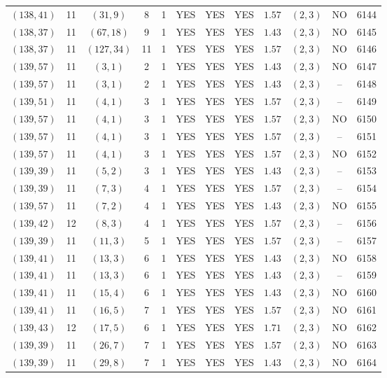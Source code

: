 \begin{longtable}{|c|c|c|c|c|c|c|c|c|c|c|c|}
$(138,41)$ & 11 & $(31,9)$ & 8 & 1 & YES & YES & YES & $1.57$ & $(2,3)$ & NO & 6144\\
$(138,37)$ & 11 & $(67,18)$ & 9 & 1 & YES & YES & YES & $1.43$ & $(2,3)$ & NO & 6145\\
$(138,37)$ & 11 & $(127,34)$ & 11 & 1 & YES & YES & YES & $1.57$ & $(2,3)$ & NO & 6146\\
$(139,57)$ & 11 & $(3,1)$ & 2 & 1 & YES & YES & YES & $1.43$ & $(2,3)$ & NO & 6147\\
$(139,57)$ & 11 & $(3,1)$ & 2 & 1 & YES & YES & YES & $1.43$ & $(2,3)$ & -- & 6148\\
$(139,51)$ & 11 & $(4,1)$ & 3 & 1 & YES & YES & YES & $1.57$ & $(2,3)$ & -- & 6149\\
$(139,57)$ & 11 & $(4,1)$ & 3 & 1 & YES & YES & YES & $1.57$ & $(2,3)$ & NO & 6150\\
$(139,57)$ & 11 & $(4,1)$ & 3 & 1 & YES & YES & YES & $1.57$ & $(2,3)$ & -- & 6151\\
$(139,57)$ & 11 & $(4,1)$ & 3 & 1 & YES & YES & YES & $1.57$ & $(2,3)$ & NO & 6152\\
$(139,39)$ & 11 & $(5,2)$ & 3 & 1 & YES & YES & YES & $1.43$ & $(2,3)$ & -- & 6153\\
$(139,39)$ & 11 & $(7,3)$ & 4 & 1 & YES & YES & YES & $1.57$ & $(2,3)$ & -- & 6154\\
$(139,57)$ & 11 & $(7,2)$ & 4 & 1 & YES & YES & YES & $1.43$ & $(2,3)$ & NO & 6155\\
$(139,42)$ & 12 & $(8,3)$ & 4 & 1 & YES & YES & YES & $1.57$ & $(2,3)$ & -- & 6156\\
$(139,39)$ & 11 & $(11,3)$ & 5 & 1 & YES & YES & YES & $1.57$ & $(2,3)$ & -- & 6157\\
$(139,41)$ & 11 & $(13,3)$ & 6 & 1 & YES & YES & YES & $1.43$ & $(2,3)$ & NO & 6158\\
$(139,41)$ & 11 & $(13,3)$ & 6 & 1 & YES & YES & YES & $1.43$ & $(2,3)$ & -- & 6159\\
$(139,41)$ & 11 & $(15,4)$ & 6 & 1 & YES & YES & YES & $1.43$ & $(2,3)$ & NO & 6160\\
$(139,41)$ & 11 & $(16,5)$ & 7 & 1 & YES & YES & YES & $1.57$ & $(2,3)$ & NO & 6161\\
$(139,43)$ & 12 & $(17,5)$ & 6 & 1 & YES & YES & YES & $1.71$ & $(2,3)$ & NO & 6162\\
$(139,39)$ & 11 & $(26,7)$ & 7 & 1 & YES & YES & YES & $1.57$ & $(2,3)$ & NO & 6163\\
$(139,39)$ & 11 & $(29,8)$ & 7 & 1 & YES & YES & YES & $1.43$ & $(2,3)$ & NO & 6164\\

\end{longtable}
